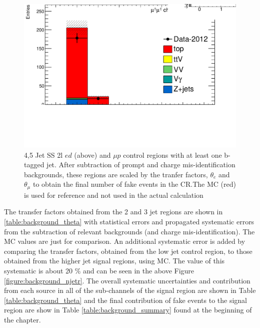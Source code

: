 \begin{figure}[htbp]
\begin{minipage}[h]{0.5\textwidth}
  \end{minipage}\hfill
  \begin{minipage}[h]{0.5\textwidth}
    \centering \includegraphics[width=\textwidth]{figs/fake/TaT-23jets-1b_nb_mm}
  \end{minipage}\hfill

  \caption{4,5 Jet SS 2l  $ed$ (above) and $\mu p$ control regions with at least one b-tagged jet. After subtraction of prompt and charge mis-identification backgrounds, these regions
    are scaled by the tranfer factors, $\theta_e$ and $\theta_{\mu}$ to obtain the final number of fake events in the CR.The \ttbar MC (red) is
  used for reference and not used in the actual calculation}
  \label{figure:background_45jets}
 \end{figure}

The transfer factors obtained from the 2 and 3 jet regions are shown in \ref{table:background_theta} with statistical errors and propagated systematic
errors from the subtraction of relevant backgrounds (\ttV and charge mis-identification). The MC values are just for comparison. An additional 
systematic error is added by comparing the transfer factors, obtained from the low jet control region, to those obtained from the 
higher jet signal regions, using \ttbar MC. The value of this systematic is about 20 \% and can be seen in the above Figure \ref{figure:background_njetr}.
The overall systematic uncertainties and contribution from each source in all of the sub-channels of the signal region are shown in Table \ref{table:background_theta}
and the final contribution of fake events to the signal region are show in Table \ref{table:background_summary} found at the beginning of the chapter.  

